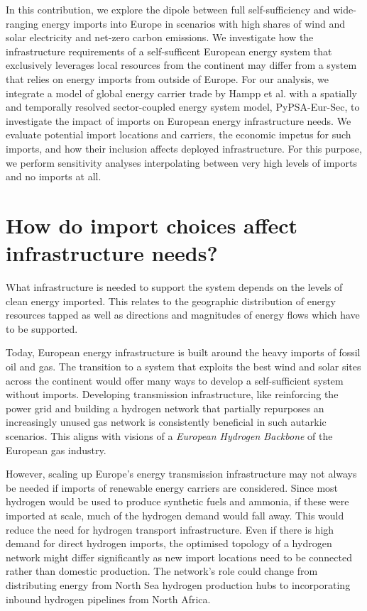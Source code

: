 \documentclass[10pt,5p,reversenotenum,lefttitle]{elsarticle}
\begin{document}
In this contribution, we explore the dipole between full self-sufficiency and
wide-ranging energy imports into Europe in scenarios with high shares of wind
and solar electricity and net-zero carbon emissions. We investigate how the
infrastructure requirements of a self-sufficent European energy system that
exclusively leverages local resources from the continent may differ from a
system that relies on energy imports from outside of Europe. For our analysis,
we integrate a model of global energy carrier trade by Hampp et
al.\cite{hamppImportOptions2021} with a spatially and temporally resolved
sector-coupled energy system model,
PyPSA-Eur-Sec,\cite{PyPSAEurSecSectorCoupled} to investigate the impact of
imports on European energy infrastructure needs. We evaluate potential import
locations and carriers, the economic impetus for such imports, and how their
inclusion affects deployed infrastructure. For this purpose, we perform
sensitivity analyses interpolating between very high levels of imports and no
imports at all.

\section*{How do import choices affect infrastructure needs?}

What infrastructure is needed to support the system depends on the levels of
clean energy imported. This relates to the geographic distribution of energy
resources tapped as well as directions and magnitudes of energy flows which have
to be supported.

Today, European energy infrastructure is built around the heavy imports of
fossil oil and gas. The transition to a system that exploits the best wind and
solar sites across the continent would offer many ways to develop a
self-sufficient system without
imports.\cite{pickeringDiversityOptions2022,brownSynergiesSector2018} Developing
transmission infrastructure, like reinforcing the power grid and building a
hydrogen network that partially repurposes an increasingly unused gas network is
consistently beneficial in such autarkic
scenarios.\cite{neumannBenefitsHydrogen2022a,wetzelGreenEnergy2022,victoriaSpeedTechnological2022} This aligns
with visions of a \textit{European Hydrogen Backbone} of the European gas
industry.
\cite{gasforclimateEuropeanHydrogen2020,gasforclimateEuropeanHydrogen2022}

However, scaling up Europe's energy transmission infrastructure may not always
be needed if imports of renewable energy carriers are considered. Since most
hydrogen would be used to produce synthetic fuels and
ammonia,\cite{neumannBenefitsHydrogen2022a} if these were imported at scale, much
of the hydrogen demand would fall away. This would reduce the need for hydrogen
transport infrastructure. Even if there is high demand for direct hydrogen
imports, the optimised topology of a hydrogen network might differ significantly
as new import locations need to be connected rather than domestic production.
The network's role could change from distributing energy from North Sea hydrogen
production hubs to incorporating inbound hydrogen pipelines from North Africa.
\end{document}
